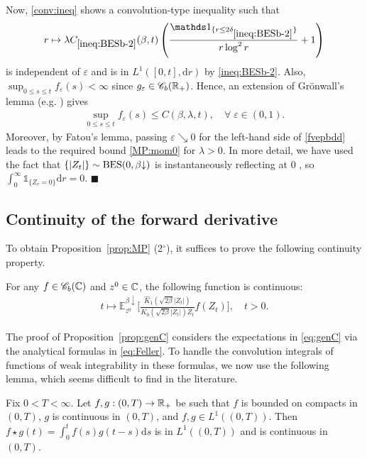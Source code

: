 \documentclass[12pt, twoside]{article}
\numberwithin{figure}{section}
\newcommand{\BES}{{\rm BES}}
\newcommand{\1}{\mathds 1}
\newcommand{\C}{{\mathscr C}}
\newcommand{\vep}{{\varepsilon}}
\newcommand{\da}{{\downarrow}}
\newcommand{\E}{{\mathbb E}}
\renewcommand{\d}{{\mathrm d}}
\newcommand{\R}{{\Bbb R}}
\newcommand{\2}{{\mathbf 1}}
\renewenvironment{proof}[1][\proofname]{\noindent {\bfseries #1.}\;}{\hfill\ensuremath{\blacksquare}\\}
\newcommand{\cc}{{^\circ}}
\newcommand{\hK}{{\widehat{K}}}
\newcommand{\deltaz}{\delta_{\ref{ineq:BESb-2}}}
\begin{document}
\begin{proof}[Proof of (\ref{MP:mom0}) of Proposition~\ref{prop:MP}]
Now, \eqref{conv:ineq} shows a convolution-type inequality such that
\[
r\mapsto \lambda C_{\ref{ineq:BESb-2}}(\beta,t)\left(\frac{\1_{\{r\leq 2\deltaz\}}}{r\log^2r}+1\right)
\]
is independent of $\vep$ and is in $ L^1([0,t],\d r)$ by \eqref{ineq:BESb-2}. Also,  $\sup_{0\leq s\leq t}f_\vep(s)<\infty$ since $g_\vep\in \C_b(\R_+)$. Hence, an extension of Gr\"onwall's lemma (e.g. \cite[Lemma~15 on pp.22--23]{Dalang}) gives
\begin{align}\label{fvepbdd}
\sup_{0\leq s\leq t}f_\vep(s)\leq C(\beta,\lambda,t),\quad \forall\;\vep\in (0,1).
\end{align}
Moreover, by Fatou's lemma, passing $\vep\searrow 0$ for the left-hand side of \eqref{fvepbdd} leads to the required bound \eqref{MP:mom0} for $\lambda>0$. In more detail, we have used the fact that $\{|Z_t|\}\sim \BES(0,\beta\da)$ is instantaneously reflecting at $0$ \cite[Theorem~2.1, p.883]{DY:Krein}, so $\int_0^\infty\1_{\{Z_r=0\}}\d r=0$. 
\end{proof}

\subsection{Continuity of the forward derivative}\label{sec:contforward}
To obtain Proposition~\ref{prop:MP} (2$\cc$), it suffices to prove the following continuity property. 

\begin{prop}\label{prop:genC}
For any $f\in \C_b(\Bbb C)$ and $z^0\in \Bbb C$, the following function is continuous:
\begin{align}\label{eq:genC}
t\mapsto \E^{\beta\da}_{z^0}\biggl[\frac{\hK_1(\sqrt{2\beta}|Z_t|)}{K_0(\sqrt{2\beta}|Z_t|)\overline{Z_t}}f(Z_t)\biggr],\quad t>0.
\end{align}
\end{prop}


The proof of Proposition~\ref{prop:genC} considers the expectations in \eqref{eq:genC} via the analytical formulas in \eqref{eq:Feller}. To handle the convolution integrals of functions of weak integrability in these formulas, we now use the following lemma, which seems difficult to find in the literature. 

\begin{lem}\label{lem:LC1}
Fix $0<T<\infty$. Let $f,g:(0,T)\to \R_+$ be such that $f$ is bounded on compacts in $(0,T)$, $g$ is continuous in $(0,T)$, and $f,g\in L^1((0,T))$. Then $f\star g(t)=\int_0^t f(s)g(t-s)\d s$ is in $L^1((0,T))$ and is continuous in $(0,T)$.  
\end{lem}
\end{document}
